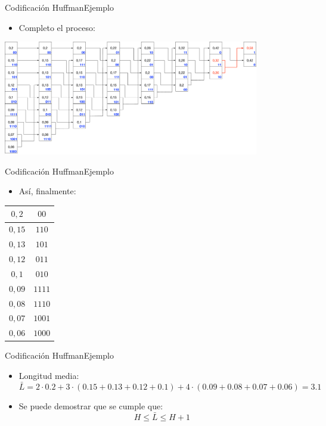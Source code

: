 \documentclass[10pt,compress]{beamer} %
\begin{document}
\begin{frame}{Codificación Huffman}{Ejemplo}
  \begin{itemize}
    \item Completo el proceso:
  \end{itemize}
  \centering \includegraphics[height=5cm]{./Figuras/Huffman10.pdf}
\end{frame}

\begin{frame}{Codificación Huffman}{Ejemplo}
  \begin{itemize}
    \item Así, finalmente:
  \end{itemize}

  \begin{tabular}{|c|c|}
    \hline
    $0,2$ & $00$ \\
    \hline
    $0,15$ & $110$ \\
    \hline
    $0,13$ & $101$ \\
    \hline
    $0,12$ & $011$ \\
    \hline
    $0,1$ & $010$ \\
    \hline
    $0,09$ & $1111$ \\
    \hline
    $0,08$ & $1110$ \\
    \hline
    $0,07$ & $1001$ \\
    \hline
    $0,06$ & $1000$ \\
    \hline
  \end{tabular}
\end{frame}

\begin{frame}{Codificación Huffman}{Ejemplo}
  \begin{itemize}
    \item Longitud media:
    \begin{displaymath}
      \bar{L} = 2\cdot 0.2 + 3 \cdot (0.15 + 0.13 + 0.12 + 0.1) + 4 \cdot (0.09 + 0.08 + 0.07 + 0.06) = 3.1
    \end{displaymath}
    \item Se puede demostrar que se cumple que:
    \begin{displaymath}
      H \leq \bar{L} \leq H+1
    \end{displaymath}
  \end{itemize}

\end{frame}
\end{document}
